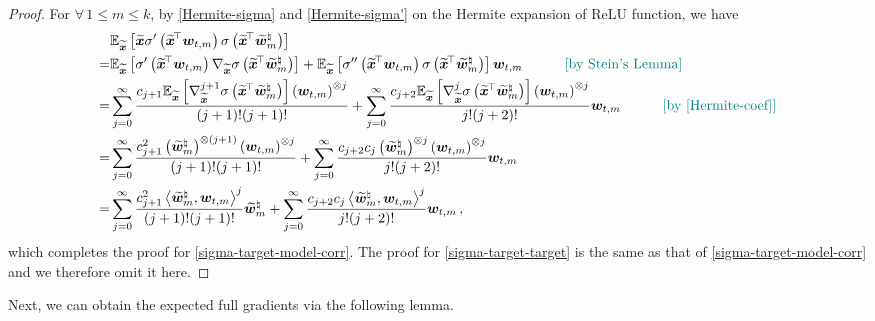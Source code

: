 \begin{proof}
For $\forall\,1\leq m \leq k$, by \cref{Hermite-sigma} and \cref{Hermite-sigma'} on the Hermite expansion of ReLU function, we have
\begin{align*}
    & \mathbb{E}_{\widetilde{\bm x}}\left[\widetilde{\bm x} \sigma' \left(\widetilde{\bm x}^{\!\top}\bm w_{t,m}\right) \sigma \left(\widetilde{\bm x}^{\!\top}\widetilde{\bm w}^\natural_m\right)\right]\\
    = & \mathbb{E}_{\widetilde{\bm x}}\left[\sigma' \left(\widetilde{\bm x}^{\!\top}\bm w_{t,m}\right) \nabla_{\widetilde{\bm x}}\sigma \left(\widetilde{\bm x}^{\!\top}\widetilde{\bm w}^\natural_m\right)\right] + \mathbb{E}_{\widetilde{\bm x}}\left[ \sigma'' \left(\widetilde{\bm x}^{\!\top}\bm w_{t,m}\right) \sigma \left(\widetilde{\bm x}^{\!\top}\widetilde{\bm w}^\natural_m\right)\right]\bm w_{t,m}\quad \tag*{\color{teal}[by Stein's Lemma]}\\
    = & \sum_{j= 0}^{\infty}\frac{c_{j+1}\mathbb{E}_{\widetilde{\bm x}}\left[\nabla_{\widetilde{\bm x}}^{j+1}\sigma \left(\widetilde{\bm x}^{\!\top}\widetilde{\bm w}^\natural_m\right)\right]\left(\bm w_{t,m}\right)^{\otimes j}}{(j+1)!(j+1)!} + \sum_{j= 0}^{\infty} \frac{c_{j+2}\mathbb{E}_{\widetilde{\bm x}}\left[\nabla_{\widetilde{\bm x}}^{j}\sigma \left(\widetilde{\bm x}^{\!\top}\widetilde{\bm w}^\natural_m\right)\right]\left(\bm w_{t,m}\right)^{\otimes j}}{j!(j+2)!}
    \bm w_{t,m}\quad \tag*{\color{teal}[by \cref{Hermite-coef}]}\\
    = & \sum_{j= 0}^{\infty}\frac{c_{j+1}^2\left(\widetilde{\bm w}^\natural_m\right)^{\otimes (j+1)}\left(\bm w_{t,m}\right)^{\otimes j}}{(j+1)!(j+1)!} + \sum_{j=0}^{\infty} \frac{c_{j+2}c_{j}\left(\widetilde{\bm w}^\natural_m\right)^{\otimes j}\left(\bm w_{t,m}\right)^{\otimes j}}{j!(j+2)!}
    \bm w_{t,m}\\
    = & \sum_{j= 0}^{\infty}\frac{c_{j+1}^2\left\langle\widetilde{\bm w}^\natural_m,\bm w_{t,m}\right\rangle^{j}}{(j+1)!(j+1)!}\widetilde{\bm w}^\natural_m + \sum_{j= 0}^{\infty}\frac{c_{j+2}c_{j}\left\langle\widetilde{\bm w}^\natural_m,\bm w_{t,m}\right\rangle^{j}}{j!(j+2)!}\bm w_{t,m}\,,
\end{align*}
which completes the proof for \cref{sigma-target-model-corr}. The proof for \cref{sigma-target-target} is the same as that of \cref{sigma-target-model-corr} and we therefore omit it here.
\end{proof}
Next, we can obtain the expected full gradients via the following lemma.
